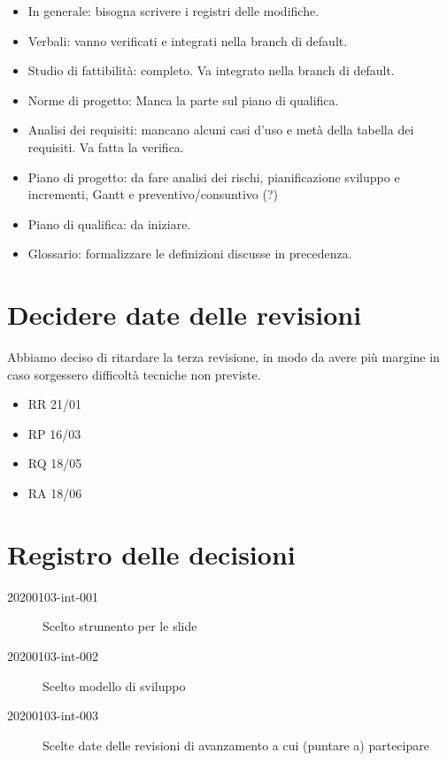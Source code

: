 \documentclass{article}
\begin{document}
\begin{itemize}
  \item In generale: bisogna scrivere i registri delle modifiche.
  \item Verbali: vanno verificati e integrati nella branch di default.
  \item Studio di fattibilità: completo. Va integrato nella branch di default.
  \item Norme di progetto: Manca la parte sul piano di qualifica.
  \item Analisi dei requisiti: mancano alcuni casi d'uso e metà della tabella dei requisiti. Va fatta la verifica.
  \item Piano di progetto: da fare analisi dei rischi, pianificazione sviluppo e incrementi, Gantt e preventivo/consuntivo (?)
  \item Piano di qualifica: da iniziare.
  \item Glossario: formalizzare le definizioni discusse in precedenza.
\end{itemize}

\section{Decidere date delle revisioni}%
\label{sec:decidere_date_delle_revisioni}

Abbiamo deciso di ritardare la terza revisione, in modo da avere più margine in caso sorgessero difficoltà tecniche non previste.

\begin{itemize}
  \item RR 21/01
  \item RP 16/03
  \item RQ 18/05
  \item RA 18/06
\end{itemize}

\newpage
\section{Registro delle decisioni}%
\label{sec:registro_delle_decisioni}

\begin{description}
  \item[20200103-int-001] Scelto strumento per le slide
  \item[20200103-int-002] Scelto modello di sviluppo
  \item[20200103-int-003] Scelte date delle revisioni di avanzamento a cui (puntare a) partecipare  
\end{description}

\end{document}
